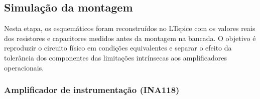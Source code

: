 \documentclass[11pt,a4paper]{article}
\begin{document}
\subsection{Simulação da montagem}







Nesta etapa, os esquemáticos foram reconstruídos no LTspice com os valores reais dos resistores e capacitores medidos antes da montagem na bancada. O objetivo é reproduzir o circuito físico em condições equivalentes e separar o efeito da tolerância dos componentes das limitações intrínsecas aos amplificadores operacionais.

\subsubsection{Amplificador de instrumentação (INA118)}
\end{document}
